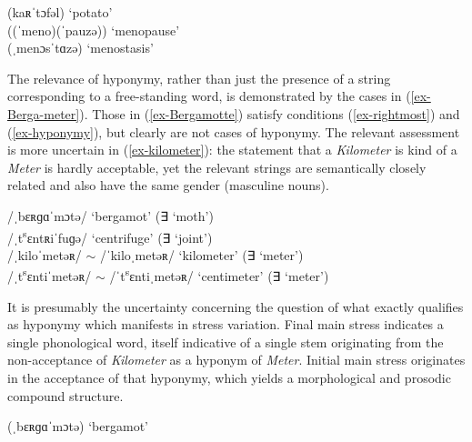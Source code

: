 \documentclass[output=paper
 ,nobabel
 ,draftmode
 ,colorlinks, citecolor=brown
]{langscibook}
\begin{document}
\ex\label{ex-kartoffel-p}
(kaʀˈtɔfəl)  `potato'\\

\ex\label{ex-menopause-p}
((ˈmeno)(ˈpauzə))  `menopause'\\

\ex\label{ex-menostase-p}
(ˌmenɔsˈtɑzə)  `menostasis'\\

\zl

\noindent
The relevance of hyponymy, rather than just the presence of a string corresponding to a free-standing word, is demonstrated by the cases in (\ref{ex-Berga-meter}). Those in (\ref{ex-Bergamotte}) satisfy conditions (\ref{ex-rightmost}) and  (\ref{ex-hyponymy}), but clearly are not cases of hyponymy. The relevant assessment is more uncertain in (\ref{ex-kilometer}): the statement that a \emph{Kilometer} is kind of a \emph{Meter} is hardly acceptable, yet the relevant strings are semantically closely related and also have the same gender (masculine nouns). 


\eal\label{ex-Berga-meter}
\ex\label{ex-Bergamotte}
/ˌbɛʀɡɑˈmɔtə/  `bergamot' (∃  `moth')  \\ 
/ˌt\textsuperscript{s}ɛntʀiˈfuɡə/  `centrifuge' (∃  `joint')  \\ 

\ex\label{ex-kilometer}
/ˌkiloˈmetəʀ/ $\sim$ /ˈkiloˌmetəʀ/   `kilometer' (∃  `meter')  \\ 
/ˌt\textsuperscript{s}ɛntiˈmetəʀ/ $\sim$ /ˈt\textsuperscript{s}ɛntiˌmetəʀ/   `centimeter' (∃  `meter')  \\ 


\zl


\largerpage[1]
\noindent
It is presumably the uncertainty concerning the question of what exactly qualifies as hyponymy which manifests in stress variation. Final main stress indicates a single phonological word, itself indicative of a single stem originating from the non-acceptance of \emph{Kilometer} as a hyponym of \emph{Meter}. Initial main stress originates in the acceptance of that hyponymy, which yields a morphological and prosodic compound structure.

\eal\label{ex-Berga-meter-P}
\ex\label{ex-Bergamotte-P}

(ˌbɛʀɡɑˈmɔtə)  `bergamot'   \\ 
\end{document}
